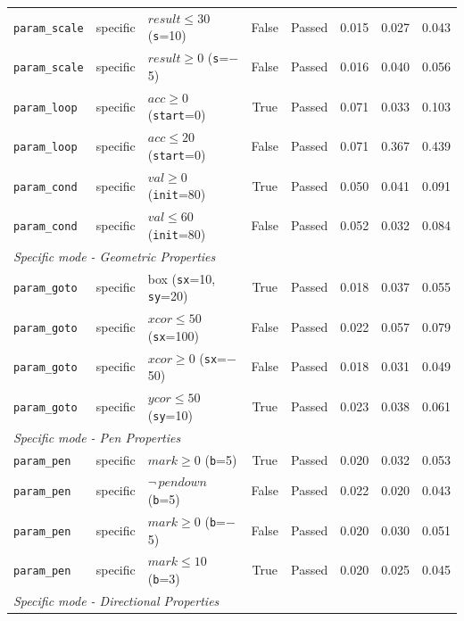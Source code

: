 {\begin{longtable}{p{} p{} p{} c c r r r}
\texttt{param\_scale}    & specific & $\mathit{result}\leq 30$ (\texttt{s}=10)  & False & Passed & 0.015 & 0.027 & 0.043 \\
\texttt{param\_scale}    & specific & $\mathit{result}\geq 0$ (\texttt{s}=$-$5) & False & Passed & 0.016 & 0.040 & 0.056 \\
\texttt{param\_loop}     & specific & $\mathit{acc}\geq 0$ (\texttt{start}=0)  & True  & Passed & 0.071 & 0.033 & 0.103 \\
\texttt{param\_loop}     & specific & $\mathit{acc}\leq 20$ (\texttt{start}=0) & False & Passed & 0.071 & 0.367 & 0.439 \\
\texttt{param\_cond}     & specific & $\mathit{val}\geq 0$ (\texttt{init}=80)  & True  & Passed & 0.050 & 0.041 & 0.091 \\
\texttt{param\_cond}     & specific & $\mathit{val}\leq 60$ (\texttt{init}=80) & False & Passed & 0.052 & 0.032 & 0.084 \\
\midrule
\multicolumn{8}{l}{\textit{Specific mode - Geometric Properties}} \\
\midrule
\texttt{param\_goto}     & specific & box (\texttt{sx}=10, \texttt{sy}=20)      & True  & Passed & 0.018 & 0.037 & 0.055 \\
\texttt{param\_goto}     & specific & $\mathit{xcor}\leq 50$ (\texttt{sx}=100) & False & Passed & 0.022 & 0.057 & 0.079 \\
\texttt{param\_goto}     & specific & $\mathit{xcor}\geq 0$ (\texttt{sx}=$-$50) & False & Passed & 0.018 & 0.031 & 0.049 \\
\texttt{param\_goto}     & specific & $\mathit{ycor}\leq 50$ (\texttt{sy}=10)  & True  & Passed & 0.023 & 0.038 & 0.061 \\
\midrule
\multicolumn{8}{l}{\textit{Specific mode - Pen Properties}} \\
\midrule
\texttt{param\_pen}      & specific & $\mathit{mark}\geq 0$ (\texttt{b}=5)    & True  & Passed & 0.020 & 0.032 & 0.053 \\
\texttt{param\_pen}      & specific & $\neg\,\mathit{pendown}$ (\texttt{b}=5) & False & Passed & 0.022 & 0.020 & 0.043 \\
\texttt{param\_pen}      & specific & $\mathit{mark}\geq 0$ (\texttt{b}=$-$5) & False & Passed & 0.020 & 0.030 & 0.051 \\
\texttt{param\_pen}      & specific & $\mathit{mark}\leq 10$ (\texttt{b}=3)  & True  & Passed & 0.020 & 0.025 & 0.045 \\
\midrule
\multicolumn{8}{l}{\textit{Specific mode - Directional Properties}} \\

\end{longtable}}
